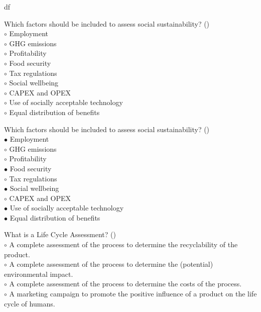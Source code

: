 df\documentclass[]{beamer}
\begin{document}
\begin{CJK}{UTF8}{gbsn}
\begin{frame}[shrink] {}
\addtocounter{questions}{1}
\color{blue}
Which factors should be included to assess social sustainability?
({})\\
\color{black}
\setlength{\parindent}{-0.4cm}
{\color{red}$\circ$}  Employment  \\
{\color{red}$\circ$} GHG emissions  \\
{\color{red}$\circ$} Profitability  \\
{\color{red}$\circ$}  Food security  \\
{\color{red}$\circ$} Tax regulations  \\
{\color{red}$\circ$}  Social wellbeing  \\
{\color{red}$\circ$} CAPEX and OPEX  \\
{\color{red}$\circ$}  Use of socially acceptable technology  \\
{\color{red}$\circ$}  Equal distribution of benefits  \\
\end{frame}
\begin{frame}[shrink] {}
\addtocounter{answers}{1}
\color{blue}
Which factors should be included to assess social sustainability?
({})\\
\color{black}
\setlength{\parindent}{-0.4cm}
{\color{red}$\bullet$} Employment  \\
{\color{red}$\circ$} GHG emissions  \\
{\color{red}$\circ$} Profitability  \\
{\color{red}$\bullet$} Food security  \\
{\color{red}$\circ$} Tax regulations  \\
{\color{red}$\bullet$} Social wellbeing  \\
{\color{red}$\circ$} CAPEX and OPEX  \\
{\color{red}$\bullet$} Use of socially acceptable technology  \\
{\color{red}$\bullet$} Equal distribution of benefits  \\
\end{frame}


\begin{frame}[shrink] {}
\addtocounter{questions}{1}
\color{blue}
What is a Life Cycle Assessment?
({})\\
\color{black}
\setlength{\parindent}{-0.4cm}
{\color{red}$\circ$} A complete assessment of the process to determine the recyclability of the product.  \\
{\color{red}$\circ$}  A complete assessment of the process to determine the (potential) environmental impact.  \\
{\color{red}$\circ$} A complete assessment of the process to determine the costs of the process.  \\
{\color{red}$\circ$} A marketing campaign to promote the positive influence of a product on the life cycle of humans.  \\


\end{frame}
\end{CJK}
\end{document}
